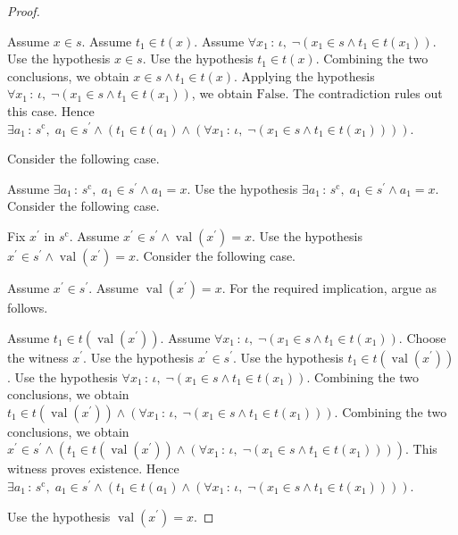 \documentclass{article}
\theoremstyle{paperresult}
\newenvironment{proofstep}{\par\smallskip\ifdim\leftskip<3em\relax\advance\leftskip by 1em\relax\fi\noindent\ignorespaces}{\par\smallskip}
\begin{document}
\begin{proof}
\begin{proofstep}
\begin{proofstep}
Assume \(x \in s\).
Assume \(t_{1} \in t\left(x\right)\).
Assume \(\forall x_{1}\, :\, \iota,\; \neg \left(x_{1} \in s \land t_{1} \in t\left(x_{1}\right)\right)\).
Use the hypothesis \(x \in s\).
Use the hypothesis \(t_{1} \in t\left(x\right)\).
Combining the two conclusions, we obtain \(x \in s \land t_{1} \in t\left(x\right)\).
Applying the hypothesis \(\forall x_{1}\, :\, \iota,\; \neg \left(x_{1} \in s \land t_{1} \in t\left(x_{1}\right)\right)\), we obtain \(\mathrm{False}\).
The contradiction rules out this case. Hence \(\exists a_{1}\, :\, s^{\mathrm c},\; a_{1} \in s^{'} \land (t_{1} \in t(a_{1}) \land (\forall x_{1}\, :\, \iota,\; \neg (x_{1} \in s \land t_{1} \in t(x_{1}))))\).
\end{proofstep}
Consider the following case.
\begin{proofstep}
Assume \(\exists a_{1}\, :\, s^{\mathrm c},\; a_{1} \in s^{'} \land a_{1} = x\).
Use the hypothesis \(\exists a_{1}\, :\, s^{\mathrm c},\; a_{1} \in s^{'} \land a_{1} = x\).
Consider the following case.
\begin{proofstep}
Fix \(x^{'}\) in \(s^{\mathrm c}\).
Assume \(x^{'} \in s^{'} \land \operatorname{val}(x^{'}) = x\).
Use the hypothesis \(x^{'} \in s^{'} \land \operatorname{val}(x^{'}) = x\).
Consider the following case.
\begin{proofstep}
Assume \(x^{'} \in s^{'}\).
Assume \(\operatorname{val}(x^{'}) = x\).
For the required implication, argue as follows.
\begin{proofstep}
Assume \(t_{1} \in t\left(\operatorname{val}(x^{'})\right)\).
Assume \(\forall x_{1}\, :\, \iota,\; \neg \left(x_{1} \in s \land t_{1} \in t\left(x_{1}\right)\right)\).
Choose the witness \(x^{'}\).
Use the hypothesis \(x^{'} \in s^{'}\).
Use the hypothesis \(t_{1} \in t\left(\operatorname{val}(x^{'})\right)\).
Use the hypothesis \(\forall x_{1}\, :\, \iota,\; \neg \left(x_{1} \in s \land t_{1} \in t\left(x_{1}\right)\right)\).
Combining the two conclusions, we obtain \(t_{1} \in t(\operatorname{val}(x^{'})) \land (\forall x_{1}\, :\, \iota,\; \neg (x_{1} \in s \land t_{1} \in t(x_{1})))\).
Combining the two conclusions, we obtain \(x^{'} \in s^{'} \land (t_{1} \in t(\operatorname{val}(x^{'})) \land (\forall x_{1}\, :\, \iota,\; \neg (x_{1} \in s \land t_{1} \in t(x_{1}))))\).
This witness proves existence. Hence \(\exists a_{1}\, :\, s^{\mathrm c},\; a_{1} \in s^{'} \land (t_{1} \in t(a_{1}) \land (\forall x_{1}\, :\, \iota,\; \neg (x_{1} \in s \land t_{1} \in t(x_{1}))))\).
\end{proofstep}
Use the hypothesis \(\operatorname{val}(x^{'}) = x\).

\end{proofstep}
\end{proofstep}
\end{proofstep}
\end{proofstep}
\end{proof}
\end{document}
